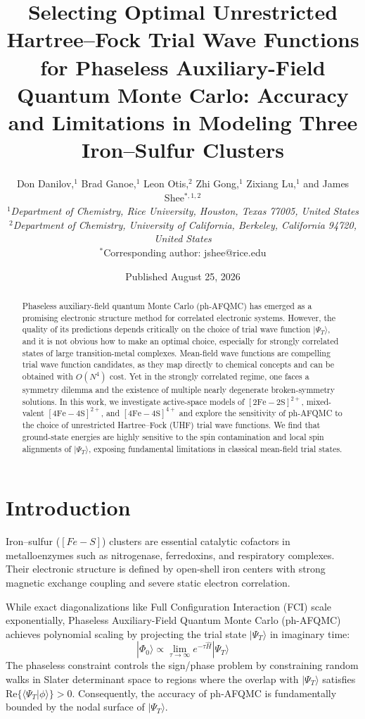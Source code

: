 \documentclass[twocolumn,10pt,letterpaper]{article}
\title{\textbf{\LARGE Selecting Optimal Unrestricted Hartree--Fock Trial Wave Functions for Phaseless Auxiliary-Field Quantum Monte Carlo: Accuracy and Limitations in Modeling Three Iron--Sulfur Clusters}}
\author{
  Don Danilov,$^{1}$ Brad Ganoe,$^{1}$ Leon Otis,$^{2}$ Zhi Gong,$^{1}$ Zixiang Lu,$^{1}$ and James Shee$^{*,1,2}$\\[1ex]
  \small $^{1}$\textit{Department of Chemistry, Rice University, Houston, Texas 77005, United States}\\
  \small $^{2}$\textit{Department of Chemistry, University of California, Berkeley, California 94720, United States}\\
  \small $^{*}$Corresponding author: jshee@rice.edu
}
\date{\small Published August 25, 2026}
\begin{document}
\maketitle

\begin{abstract}
Phaseless auxiliary-field quantum Monte Carlo (ph-AFQMC) has emerged as a promising electronic structure method for correlated electronic systems. However, the quality of its predictions depends critically on the choice of trial wave function $|\Psi_T\rangle$, and it is not obvious how to make an optimal choice, especially for strongly correlated states of large transition-metal complexes. Mean-field wave functions are compelling trial wave function candidates, as they map directly to chemical concepts and can be obtained with $O(N^4)$ cost. Yet in the strongly correlated regime, one faces a symmetry dilemma and the existence of multiple nearly degenerate broken-symmetry solutions. In this work, we investigate active-space models of $[2\text{Fe}-2\text{S}]^{2+}$, mixed-valent $[4\text{Fe}-4\text{S}]^{2+}$, and $[4\text{Fe}-4\text{S}]^{4+}$ and explore the sensitivity of ph-AFQMC to the choice of unrestricted Hartree--Fock (UHF) trial wave functions. We find that ground-state energies are highly sensitive to the spin contamination and local spin alignments of $|\Psi_T\rangle$, exposing fundamental limitations in classical mean-field trial states.
\end{abstract}

\section{Introduction}
Iron--sulfur ($[Fe-S]$) clusters are essential catalytic cofactors in metalloenzymes such as nitrogenase, ferredoxins, and respiratory complexes. Their electronic structure is defined by open-shell iron centers with strong magnetic exchange coupling and severe static electron correlation. 

While exact diagonalizations like Full Configuration Interaction (FCI) scale exponentially, Phaseless Auxiliary-Field Quantum Monte Carlo (ph-AFQMC) achieves polynomial scaling by projecting the trial state $|\Psi_T\rangle$ in imaginary time:
\begin{equation}
|\Phi_0\rangle \propto \lim_{\tau \to \infty} e^{-\tau \hat{H}} |\Psi_T\rangle
\end{equation}
The phaseless constraint controls the sign/phase problem by constraining random walks in Slater determinant space to regions where the overlap with $|\Psi_T\rangle$ satisfies $\text{Re}\{\langle \Psi_T | \phi\rangle\} > 0$. Consequently, the accuracy of ph-AFQMC is fundamentally bounded by the nodal surface of $|\Psi_T\rangle$.
\end{document}
